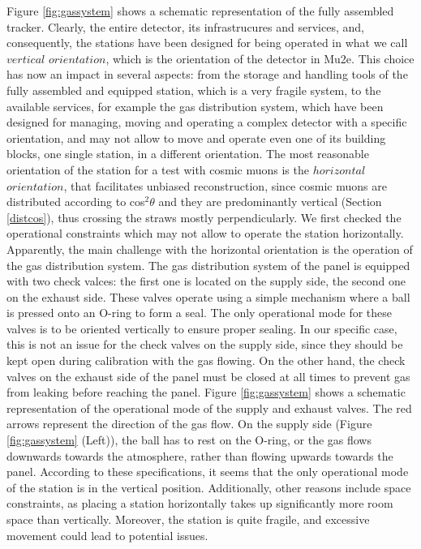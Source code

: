 Figure \ref{fig:gassystem}  shows a schematic representation of the fully assembled tracker. Clearly, the
entire detector, its infrastrucures and services, and, consequently, the stations have been
designed for being operated in what we call $vertical$ $orientation$, which is the orientation of
the detector in Mu2e. This choice has now an impact in several aspects: from the storage and
handling tools of the fully assembled and equipped station, which is a very fragile system, to
the available services, for example the gas distribution system, which have been designed for
managing, moving and operating a complex detector with a specific orientation, and may not
allow to move and operate even one of its building blocks, one single station, in a different
orientation. The most reasonable orientation of the station for a test with
cosmic muons is the $horizontal$ $orientation$, that facilitates unbiased 
reconstruction, since cosmic muons are distributed according to 
cos$^2\theta$ and they are predominantly vertical 
(Section \ref{distcos}), thus crossing the straws mostly perpendicularly.
We first checked the operational constraints
which may not allow to operate the station horizontally.
Apparently, the main challenge with the horizontal orientation is the operation of the gas
distribution system. The gas distribution system of the panel is equipped with two check valces:
the first one is located on the supply side, the second one on the exhaust side. These valves
operate using a simple mechanism where a ball is pressed onto an O-ring to form a seal. The
only operational mode for these valves is to be oriented vertically to ensure proper sealing. In
our specific case, this is not an issue for the check valves on the supply side, since they should
be kept open during calibration with the gas flowing. On the other hand, the check valves on
the exhaust side of the panel must be closed at all times to prevent gas from leaking before
reaching the panel. Figure \ref{fig:gassystem} shows a schematic 
representation of the operational mode of the supply 
and exhaust valves. The red arrows represent the 
direction of the gas flow. On the supply side (Figure 
\ref{fig:gassystem} (Left)), the ball has to rest on the 
O-ring, or the gas flows downwards towards the atmosphere, 
rather than flowing upwards towards the panel. According 
to these specifications, it seems that the only operational 
mode of the station is in the vertical position. 
Additionally, other reasons include space constraints, as placing 
a station horizontally takes up significantly more room space than 
vertically. Moreover, the station is quite fragile, and 
excessive movement could lead to potential issues.

